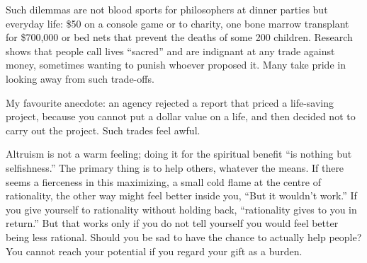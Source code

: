 Such dilemmas are not blood sports for philosophers at dinner parties but everyday life: \$50 on a console game or to charity, one bone marrow transplant for \$700,000 or bed nets that prevent the deaths of some 200 children. Research shows that people call lives ``sacred'' and are indignant at any trade against money, sometimes wanting to punish whoever proposed it. Many take pride in looking away from such trade-offs. 

My favourite anecdote: an agency rejected a report that priced a life-saving project, because you cannot put a dollar value on a life, and then decided not to carry out the project. Such trades feel awful. 

Altruism is not a warm feeling; doing it for the spiritual benefit ``is nothing but selfishness.'' The primary thing is to help others, whatever the means. If there seems a fierceness in this maximizing, a small cold flame at the centre of rationality, the other way might feel better inside you, ``But it wouldn't work.'' If you give yourself to rationality without holding back, ``rationality gives to you in return.'' But that works only if you do not tell yourself you would feel better being less rational. Should you be sad to have the chance to actually help people? You cannot reach your potential if you regard your gift as a burden.
